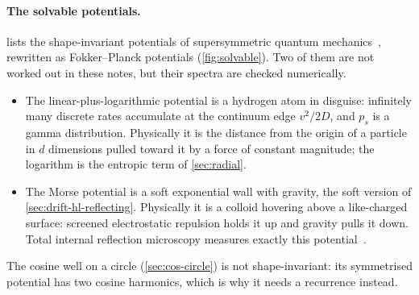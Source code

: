 \documentclass[11pt]{article}
\numberwithin{equation}{section}
\begin{document}
\paragraph{The solvable potentials.}  lists the shape-invariant potentials of supersymmetric
quantum mechanics~\cite{cooper}, rewritten as Fokker--Planck potentials (\cref{fig:solvable}). Two of them are
not worked out in these notes, but their spectra are checked numerically.
\begin{itemize}
  \item The linear-plus-logarithmic potential is a hydrogen atom in disguise: infinitely many discrete rates
        accumulate at the continuum edge $v^2/2D$, and $p_s$ is a gamma distribution. Physically it is the
        distance from the origin of a particle in $d$ dimensions pulled toward it by a force of constant magnitude;
        the logarithm is the entropic term of \cref{sec:radial}.
  \item The Morse potential is a soft exponential wall with gravity, the soft version of
        \cref{sec:drift-hl-reflecting}. Physically it is a colloid hovering above a like-charged surface: screened
        electrostatic repulsion holds it up and gravity pulls it down. Total internal reflection microscopy
        measures exactly this potential~\cite{prieve}.
\end{itemize}
The cosine well on a circle (\cref{sec:cos-circle}) is not shape-invariant: its symmetrised potential has two
cosine harmonics, which is why it needs a recurrence instead.
\end{document}
